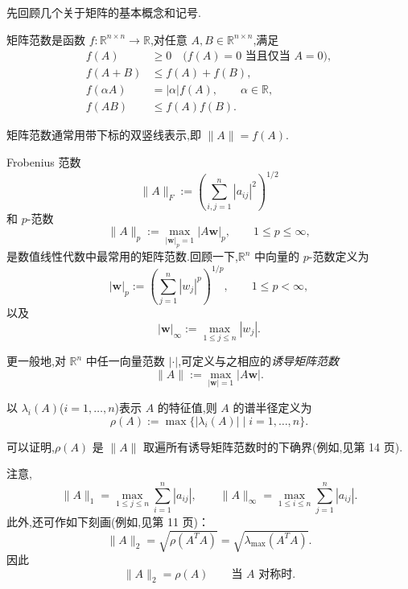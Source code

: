 先回顾几个关于矩阵的基本概念和记号.
\begin{definition*}[矩阵范数]
矩阵范数是函数 \(f\colon\mathbb R^{n\times n}\to\mathbb R\),对任意 \(A,B\in\mathbb R^{n\times n}\),满足
\[
  \begin{aligned}
    f(A)&\ge0\quad\text{(\(f(A)=0\) 当且仅当 \(A=0\))},\\
    f(A+B)&\le f(A)+f(B),\\
    f(\alpha A)&=|\alpha|f(A),\qquad \alpha\in\mathbb R,\\
    f(AB)&\le f(A)f(B).
  \end{aligned}
\]
\end{definition*}
矩阵范数通常用带下标的双竖线表示,即 \(\|A\|=f(A)\).

Frobenius 范数
\begin{equation}\label{eq:2.1.17}
  \|A\|_F:=\left(\sum_{i,j=1}^n|a_{ij}|^2\right)^{1/2}
\end{equation}
和 \(p\)-范数
\begin{equation}\label{eq:2.1.18}
  \|A\|_p:=\max_{|\boldsymbol{w}|_p=1}|A\boldsymbol{w}|_p,\qquad 1\le p\le\infty,
\end{equation}
是数值线性代数中最常用的矩阵范数.回顾一下,\(\mathbb R^n\) 中向量的 \(p\)-范数定义为
\begin{equation}\label{eq:2.1.19}
  |\boldsymbol{w}|_p:=\left(\sum_{j=1}^n|w_j|^p\right)^{1/p},
  \qquad 1\le p<\infty,
\end{equation}
以及
\begin{equation}\label{eq:2.1.20}
  |\boldsymbol{w}|_\infty:=\max_{1\le j\le n}|w_j|.
\end{equation}

更一般地,对 \(\mathbb R^n\) 中任一向量范数 \(|\cdot|\),可定义与之相应的\emph{诱导矩阵范数}
\[
  \|A\|:=\max_{|\boldsymbol{w}|=1}|A\boldsymbol{w}|.
\]

\begin{definition*}[谱半径]
以 \(\lambda_i(A)\)(\(i=1,\ldots,n\))表示 \(A\) 的特征值,则 \(A\) 的谱半径定义为
\begin{equation}\label{eq:2.1.21}
  \rho(A):=\max\bigl\{|\lambda_i(A)|\mid i=1,\ldots,n\bigr\}.
\end{equation}
\end{definition*}
可以证明,\(\rho(A)\) 是 \(\|A\|\) 取遍所有诱导矩阵范数时的下确界(例如,见第 14 页).

注意,
\begin{equation}\label{eq:2.1.22}
  \|A\|_1=\max_{1\le j\le n}\sum_{i=1}^n|a_{ij}|,
  \qquad
  \|A\|_\infty=\max_{1\le i\le n}\sum_{j=1}^n|a_{ij}|.
\end{equation}
此外,还可作如下刻画(例如,见第 11 页)：
\begin{equation}\label{eq:2.1.23}
  \|A\|_2=\sqrt{\rho(A^TA)}=\sqrt{\lambda_{\max}(A^TA)}.
\end{equation}
因此
\begin{equation}\label{eq:2.1.24}
  \|A\|_2=\rho(A)\qquad\text{当 \(A\) 对称时.}
\end{equation}

